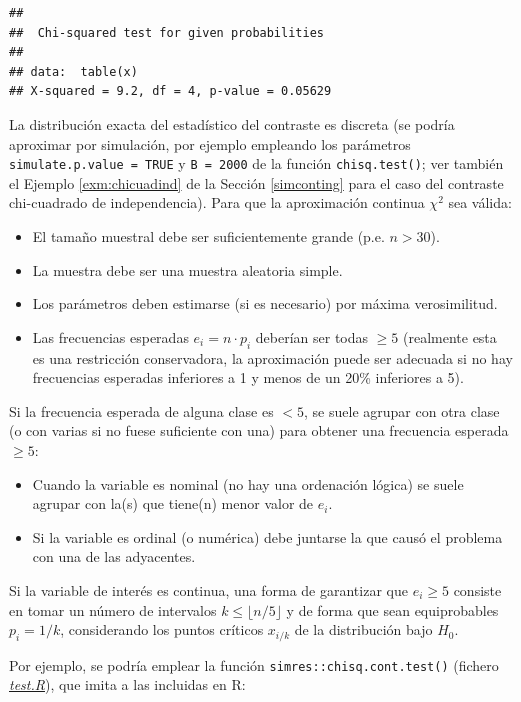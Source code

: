 \documentclass[
]{book}
\theoremstyle{break}
\theoremstyle{nonumberplain}
\begin{document}
\begin{verbatim}
## 
##  Chi-squared test for given probabilities
## 
## data:  table(x)
## X-squared = 9.2, df = 4, p-value = 0.05629
\end{verbatim}

La distribución exacta del estadístico del contraste es discreta (se podría aproximar por simulación, por ejemplo empleando los parámetros \texttt{simulate.p.value\ =\ TRUE} y \texttt{B\ =\ 2000} de la función \texttt{chisq.test()}; ver también el Ejemplo \ref{exm:chicuadind} de la Sección \ref{simconting} para el caso del contraste chi-cuadrado de independencia).
Para que la aproximación continua \(\chi^2\) sea válida:

\begin{itemize}
\item
  El tamaño muestral debe ser suficientemente grande (p.e. \(n>30\)).
\item
  La muestra debe ser una muestra aleatoria simple.
\item
  Los parámetros deben estimarse (si es necesario) por máxima
  verosimilitud.
\item
  Las frecuencias esperadas \(e_{i}=n\cdot p_{i}\) deberían ser todas
  \(\geq5\) (realmente esta es una restricción conservadora, la aproximación
  puede ser adecuada si no hay frecuencias esperadas inferiores a 1 y
  menos de un 20\% inferiores a 5).
\end{itemize}

Si la frecuencia esperada de alguna clase es \(<5\), se suele agrupar con otra
clase (o con varias si no fuese suficiente con una) para obtener una
frecuencia esperada \(\geq5\):

\begin{itemize}
\item
  Cuando la variable es nominal (no hay una ordenación lógica) se
  suele agrupar con la(s) que tiene(n) menor valor de \(e_{i}\).
\item
  Si la variable es ordinal (o numérica) debe juntarse la que causó el
  problema con una de las adyacentes.
\end{itemize}

Si la variable de interés es continua, una forma de garantizar que \(e_{i}\geq5\) consiste en tomar un número de intervalos \(k\leq \lfloor n/5 \rfloor\) y de forma que sean equiprobables \(p_{i}=1/k\),
considerando los puntos críticos \(x_{i/k}\) de la distribución bajo \(H_0\).

Por ejemplo, se podría emplear la función \texttt{simres::chisq.cont.test()} (fichero \href{R/test.R}{\emph{test.R}}), que imita a las incluidas en R:
\end{document}
